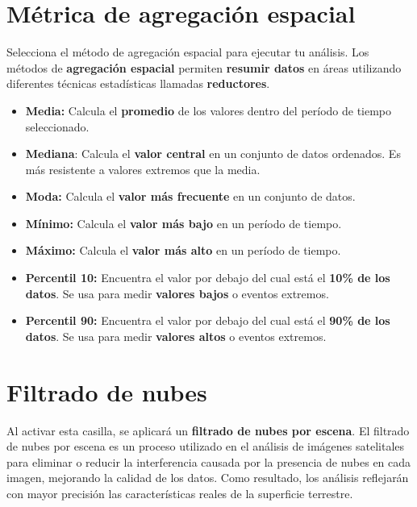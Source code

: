 \documentclass[
]{book}
\providecommand{\tightlist}{%
  \setlength{\itemsep}{0pt}\setlength{\parskip}{0pt}}
\begin{document}
\chapter{Métrica de agregación espacial}\label{agregacion-espacial}

Selecciona el método de agregación espacial para ejecutar tu análisis. Los métodos de \textbf{agregación espacial} permiten \textbf{resumir datos} en áreas utilizando diferentes técnicas estadísticas llamadas \textbf{reductores}.

\begin{itemize}
\tightlist
\item
  \textbf{Media:} Calcula el \textbf{promedio} de los valores dentro del período de tiempo seleccionado.\\
\item
  \textbf{Mediana}: Calcula el \textbf{valor central} en un conjunto de datos ordenados. Es más resistente a valores extremos que la media.\\
\item
  \textbf{Moda:} Calcula el \textbf{valor más frecuente} en un conjunto de datos.\\
\item
  \textbf{Mínimo:} Calcula el \textbf{valor más bajo} en un período de tiempo.\\
\item
  \textbf{Máximo:} Calcula el \textbf{valor más alto} en un período de tiempo.\\
\item
  \textbf{Percentil 10:} Encuentra el valor por debajo del cual está el \textbf{10\% de los datos}. Se usa para medir \textbf{valores bajos} o eventos extremos.\\
\item
  \textbf{Percentil 90:} Encuentra el valor por debajo del cual está el \textbf{90\% de los datos}. Se usa para medir \textbf{valores altos} o eventos extremos.
\end{itemize}

\chapter{Filtrado de nubes}\label{filtrado-nubes}

Al activar esta casilla, se aplicará un \textbf{filtrado de nubes por escena}. El filtrado de nubes por escena es un proceso utilizado en el análisis de imágenes satelitales para eliminar o reducir la interferencia causada por la presencia de nubes en cada imagen, mejorando la calidad de los datos. Como resultado, los análisis reflejarán con mayor precisión las características reales de la superficie terrestre.
\end{document}

